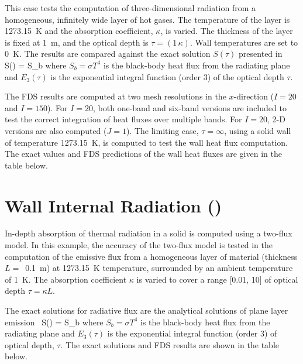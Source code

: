 \documentclass[11pt]{book}
\begin{document}
This case tests the computation of three-dimensional radiation from a homogeneous, infinitely wide layer of hot gases.  The temperature of
the layer is 1273.15~K and the absorption coefficient, $\kappa$, is varied. The thickness of the layer is fixed at 1~m, and the optical depth is $\tau = (1 \, \kappa)$.
Wall temperatures are set to 0~K. The results are compared against the exact solution $S(\tau)$ presented in~\cite{Zeldovich:1}
\be S(\tau) = S_b \ee
where $S_b = \sigma T^4$ is the black-body heat flux from the radiating plane and $E_3(\tau)$ is the exponential
integral function (order 3) of the optical depth $\tau$.

The FDS results are computed at two mesh resolutions in the $x$-direction ($I=20$ and $I=150$). For $I=20$, both one-band and six-band versions are
included to test the correct integration of heat fluxes over multiple bands. For $I=20$, 2-D versions are also computed ($J=1$). The limiting case, $\tau=\infty$,
using a solid wall of temperature 1273.15~K, is computed to test the wall heat flux computation. The exact values and FDS predictions of
the wall heat fluxes are given in the table below.



\section{Wall Internal Radiation (\texorpdfstring{}{wall\_internal\_radiation}) }
\label{wall_internal_radiation}

In-depth absorption of thermal radiation in a solid is computed using a two-flux model.  In this example, the accuracy of the two-flux model is tested in the computation of the emissive flux from a homogeneous layer of material (thickness $L=$~0.1~m) at 1273.15~K temperature, surrounded by an ambient temperature of 1~K. The absorption coefficient $\kappa$ is varied to cover a range [0.01, 10] of optical depth $\tau = \kappa L$.

The exact solutions for radiative flux are the analytical solutions of plane layer emission~\cite{Zeldovich:1}
\be
   S(\tau) = S_b
\ee
where $S_b = \sigma T^4$ is the black-body heat flux from the radiating plane and $E_3(\tau)$ is the exponential integral function (order 3) of optical depth, $\tau$. The exact solutions and FDS results are shown in the table below.
\end{document}
